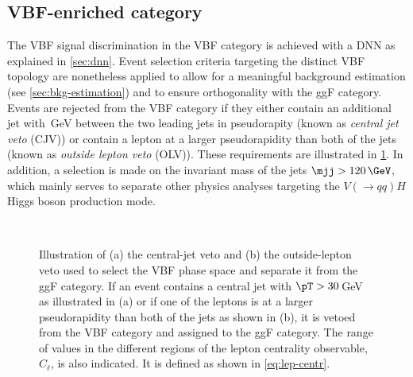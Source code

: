 \subsection{VBF-enriched \TwoJet category}
\label{subsec:vbf-category}
The VBF signal discrimination in the VBF \TwoJet category is achieved with a DNN as explained in \cref{sec:dnn}.
Event selection criteria targeting the distinct VBF topology are nonetheless applied to allow for a meaningful background estimation (see \cref{sec:bkg-estimation}) and to ensure orthogonality with the ggF \TwoJet category. 
Events are rejected from the VBF category if they either contain an additional jet with \,GeV between the two leading jets in pseudorapity (known as \emph{central jet veto} (CJV)) or contain a lepton at a larger pseudorapidity than both of the jets (known as \emph{outside lepton veto} (OLV)).
These requirements are illustrated in \cref{fig:cjv-olv-illustration}. 
In addition, a selection is made on the invariant mass of the jets $\mjj > 120\,\GeV$, which mainly serves to separate other physics analyses targeting the $V(\to qq)H$ Higgs boson production mode.
\begin{figure}[ht]
   \\
  \caption[Illustration of the central-jet veto and the outside-lepton veto.]{Illustration of (a) the central-jet veto and (b) the outside-lepton veto used to select the VBF phase space and separate it from the ggF \TwoJet category. If an event contains a central jet with $\pT > 30$\,GeV as illustrated in (a) or if one of the leptons is at a larger pseudorapidity than both of the jets as shown in (b), it is vetoed from the VBF \TwoJet category and assigned to the ggF \TwoJet category. The range of values in the different regions of the lepton centrality observable, $C_\ell$, is also indicated. It is defined as shown in \cref{eq:lep-centr}. 
  \label{fig:cjv-olv-illustration}
  }
\end{figure}

